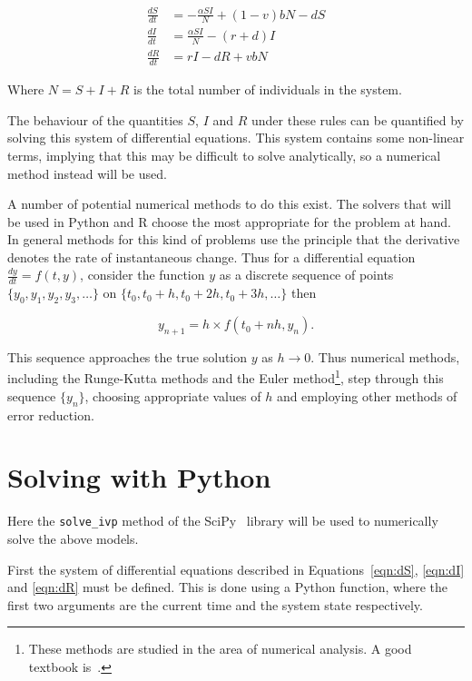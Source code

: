 \begin{align}
\frac{dS}{dt} &= -\frac{\alpha SI}{N} + (1 - v)bN - dS \label{eqn:dS}\\
\frac{dI}{dt} &= \frac{\alpha SI}{N} - (r + d)I \label{eqn:dI}\\
\frac{dR}{dt} &= rI - dR + vbN \label{eqn:dR}
\end{align}

Where $N = S + I + R$ is the total number of individuals in the system.

The behaviour of the quantities $S$, $I$ and $R$ under these rules can be
quantified by solving this system of differential equations. This system
contains some non-linear terms, implying that this may be
difficult to solve analytically, so a numerical method instead will be used.

A number of potential numerical methods to do this exist.
The solvers that will be used in Python and R choose the most appropriate for
the problem at hand. In general methods for this kind of problems use the
principle that the derivative denotes the rate of instantaneous change. Thus for
a differential equation $\frac{dy}{dt} = f(t,y)$, consider the function $y$ as a
discrete sequence of points $\{y_0, y_1, y_2, y_3, \dots\}$ on
$\{t_0, t_0 + h, t_0 + 2h, t_0 + 3h, \dots\}$ then

\begin{equation}
y_{n+1} = h \times f(t_0 + nh, y_n).
\end{equation}

This sequence approaches the true solution $y$ as $h \rightarrow 0$.
Thus numerical methods, including the Runge-Kutta methods and
the Euler method\footnote{
    These methods are studied in the area of numerical analysis. A good textbook
    is~\cite{burden2001numerical}.
},
step through this sequence $\{y_n\}$, choosing appropriate values of $h$ and
employing other methods of error reduction.


\section{Solving with Python}\label{sec:system_dynamics_solving-with-python}

Here the \texttt{solve_ivp} method of the
SciPy~\cite{2020SciPy-NMeth} library will be used to numerically
solve the above models.

First the system of differential equations described in Equations~\ref{eqn:dS},
\ref{eqn:dI} and \ref{eqn:dR} must be defined. This is done using a
Python function, where the first two arguments are the current time and the
system state respectively.

